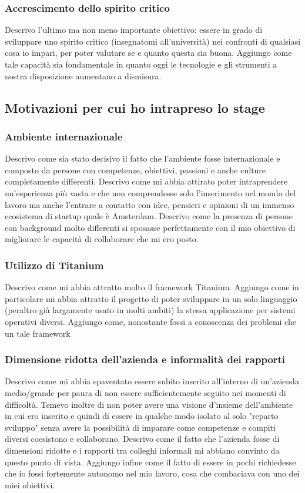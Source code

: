 			\subsubsection{Accrescimento dello spirito critico}
				Descrivo l'ultimo ma non meno importante obiettivo: essere in grado di sviluppare uno spirito critico (insegnatomi
				all'università) nei confronti di qualsiasi cosa io impari, per poter valutare se e quanto questa sia buona. Aggiungo
				come tale capacità sia fondamentale in quanto oggi le tecnologie e gli strumenti a nostra disposizione aumentano a
				dismisura.
		\subsection{Motivazioni per cui ho intrapreso lo stage}
			\subsubsection{Ambiente internazionale}
				Descrivo come sia stato decisivo il fatto che l'ambiente fosse internazionale e composto da persone con competenze,
				obiettivi, passioni e anche culture completamente differenti. Descrivo come mi abbia attirato poter intraprendere
				un'esperienza più vasta e che non comprendesse solo l'inserimento nel mondo del lavoro ma anche l'entrare a contatto
				con idee, pensieri e opinioni di un immenso ecosistema di startup quale è Amsterdam. Descrivo come la presenza di
				persone con background molto differenti si sposasse perfettamente con il mio obiettivo di migliorare le capacità di
				collaborare che mi ero posto.
			\subsubsection{Utilizzo di Titanium}
				Descrivo come mi abbia attratto molto il framework Titanium. Aggiungo come in particolare mi abbia attratto il
				progetto di poter sviluppare in un solo linguaggio (peraltro già largamente usato in molti ambiti) la stessa
				applicazione per sistemi operativi diversi. Aggiungo come, nonostante fossi a conoscenza dei problemi che un tale
				framework 
			\subsubsection{Dimensione ridotta dell'azienda e informalità dei rapporti}
				Descrivo come mi abbia spaventato essere subito inserito all'interno di un'azienda medio/grande per paura di non
				essere sufficientemente seguito nei momenti di difficoltà. Temevo inoltre di non poter avere una visione d'insieme
				dell'ambiente in cui ero inserito e quindi di essere in qualche modo isolato al solo "reparto sviluppo" senza avere
				la possibilità di imparare come competenze e compiti diversi coesistono e collaborano. Descrivo come il fatto che
				l'azienda fosse di dimensioni ridotte e i rapporti tra colleghi informali mi abbiano convinto da questo punto di
				vista. Aggiungo infine come il fatto di essere in pochi richiedesse che io fossi fortemente autonomo nel mio lavoro,
				cosa che combaciava con uno dei miei obiettivi.
